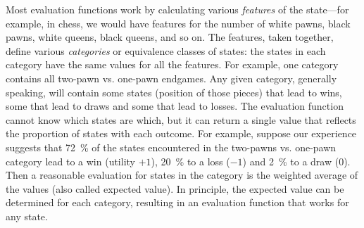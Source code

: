 Most evaluation functions work by calculating various \emph{features} of the state—for example, in chess, we would have features for the number of white pawns, black pawns, white queens, black queens, and so on. The features, taken together, define various \emph{categories} or equivalence classes of states: the states in each category have the same values for all the features. For example, one category contains all two-pawn vs. one-pawn endgames. Any given category, generally speaking, will contain some states (position of those pieces) that lead to wins, some that lead to draws and some that lead to losses. The evaluation function cannot know which states are which, but it can return a single value that reflects the proportion of states with each outcome. For example, suppose our experience suggests that \SI{72}{\percent} of the states encountered in the two-pawns vs. one-pawn category lead to a win (utility $+1$), \SI{20}{\percent} to a loss ($-1$) and \SI{2}{\percent} to a draw ($0$). Then a reasonable evaluation for states in the category is the weighted average of the values (also called expected value). In principle, the expected value can be determined for each category, resulting in an evaluation function that works for any state.

